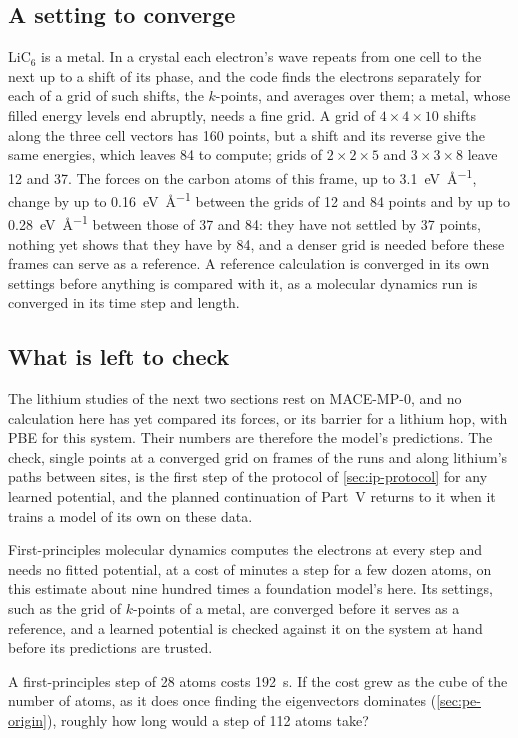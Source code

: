 \subsection*{A setting to converge}

LiC$_6$ is a metal. In a crystal each electron's wave repeats from one
cell to the next up to a shift of its phase, and the code finds the
electrons separately for each of a grid of such shifts, the $k$-points,
and averages over them; a metal, whose filled energy levels end
abruptly, needs a fine grid. A grid of $4\times4\times10$ shifts along
the three cell vectors has 160 points, but a shift and its reverse give
the same energies, which leaves 84 to compute; grids of $2\times2\times5$
and $3\times3\times8$ leave 12 and 37. The forces on the carbon atoms of
this frame, up to \SI{3.1}{\electronvolt\per\angstrom}, change by up to
\SI{0.16}{\electronvolt\per\angstrom} between the grids of 12 and 84
points and by up to \SI{0.28}{\electronvolt\per\angstrom} between those
of 37 and 84: they have not settled by 37 points, nothing yet shows that
they have by 84, and a denser grid is needed before these frames can
serve as a reference. A reference
calculation is converged in its own settings before anything is compared
with it, as a molecular dynamics run is converged in its time step
and length.

\subsection*{What is left to check}

The lithium studies of the next two sections rest on MACE-MP-0, and no
calculation here has yet compared its forces, or its barrier for a
lithium hop, with PBE for this system. Their numbers are therefore the
model's predictions. The check, single points at a converged grid on
frames of the runs and along lithium's paths between sites, is the first
step of the protocol of \cref{sec:ip-protocol} for any learned potential,
and the planned continuation of Part~V returns to it when it trains a model of its own on these data.

\begin{keyidea}
First-principles molecular dynamics computes the electrons at every step
and needs no fitted potential, at a cost of minutes a step for a few
dozen atoms, on this estimate about nine hundred times a foundation
model's here. Its settings,
such as the grid of $k$-points of a metal, are converged before it serves
as a reference, and a learned potential is checked against it on the
system at hand before its predictions are trusted.
\end{keyidea}


\begin{selfcheck}
A first-principles step of 28 atoms costs \SI{192}{\second}. If the cost
grew as the cube of the number of atoms, as it does once finding the
eigenvectors dominates (\cref{sec:pe-origin}), roughly how long would a
step of 112 atoms take?
\end{selfcheck}
